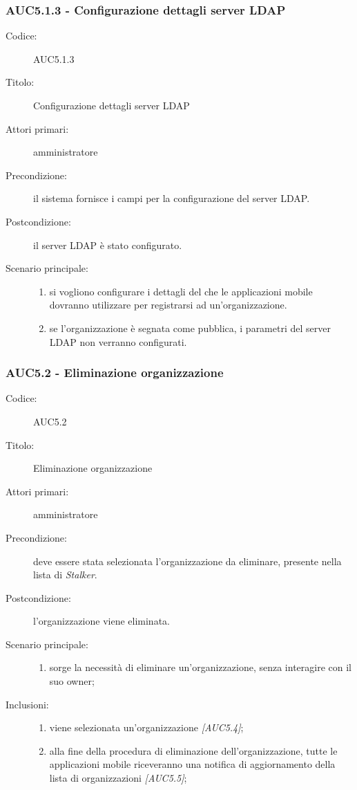\documentclass[../analisi-dei-requisiti.tex]{subfiles}
\begin{document}
  \subsubsection{AUC5.1.3 - Configurazione dettagli server LDAP}%
  \label{subsub:AUC5.1.3}
  \begin{description}
    \item[Codice:] AUC5.1.3
    \item[Titolo:] Configurazione dettagli server LDAP
    \item[Attori primari:] amministratore
    \item[Precondizione:] il sistema fornisce i campi per la configurazione del server LDAP.
    \item[Postcondizione:] il server LDAP è stato configurato.
    \item[Scenario principale:]
    \begin{enumerate}
      \item si vogliono configurare i dettagli del  che le applicazioni mobile dovranno utilizzare per registrarsi ad un'organizzazione.
      \item se l'organizzazione è segnata come pubblica, i parametri del server LDAP non verranno configurati.
    \end{enumerate}
  \end{description}

\subsubsection{AUC5.2 - Eliminazione organizzazione}%
\label{subsub:AUC5.2}
\begin{description}
  \item[Codice:] AUC5.2
  \item[Titolo:] Eliminazione organizzazione
  \item[Attori primari:] amministratore
  \item[Precondizione:] deve essere stata selezionata l'organizzazione da eliminare, presente nella lista di \emph{Stalker}.
  \item[Postcondizione:] l'organizzazione viene eliminata.
  \item[Scenario principale:]
  \begin{enumerate}
    \item sorge la necessità di eliminare un'organizzazione, senza interagire con il suo owner;
  \end{enumerate}
  \item[Inclusioni:]
  \begin{enumerate}
    \item viene selezionata un'organizzazione \emph{[AUC5.4]};
    \item alla fine della procedura di eliminazione dell'organizzazione, tutte le applicazioni mobile riceveranno una notifica di aggiornamento della lista di organizzazioni \emph{[AUC5.5]};
  \end{enumerate}
\end{description}
\end{document}
